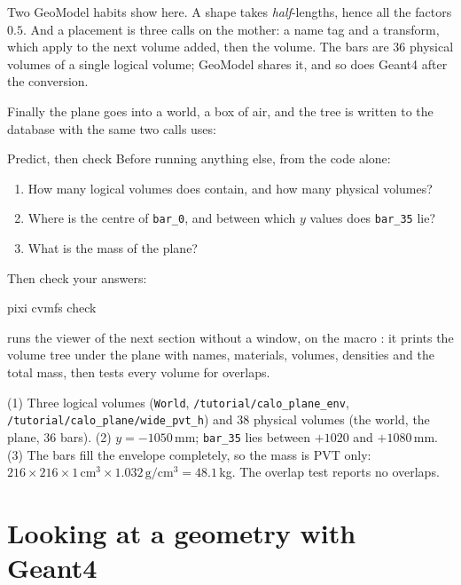 Two GeoModel habits show here. A shape takes \emph{half}-lengths, hence all
the factors $0.5$. And a placement is three calls on the mother: a name tag
and a transform, which apply to the next volume added, then the volume. The
bars are 36 physical volumes of a single logical volume; GeoModel shares it,
and so does Geant4 after the conversion.

Finally the plane goes into a world, a box of air, and the tree is written
to the database with the same two calls  uses:

\begin{exercise}{Predict, then check}
\label{ex:planepredict}
Before running anything else, from the code alone:
\begin{enumerate}
  \item How many logical volumes does  contain, and how
        many physical volumes?
  \item Where is the centre of \texttt{bar\_0}, and between which $y$ values
        does \texttt{bar\_35} lie?
  \item What is the mass of the plane?
\end{enumerate}
Then check your answers:
\begin{shell}
pixi cvmfs check
\end{shell}
 runs the viewer of the next section without a window, on the
macro : it prints the volume tree under the plane with
names, materials, volumes, densities and the total mass, then tests every
volume for overlaps.
\end{exercise}

\begin{solution}
(1) Three logical volumes (\texttt{World}, \texttt{/tutorial/calo\_plane\_env},
\texttt{/tutorial/calo\_plane/wide\_pvt\_h}) and 38 physical volumes (the
world, the plane, 36 bars). (2) $y=-1050$\,mm; \texttt{bar\_35} lies between
$+1020$ and $+1080$\,mm. (3) The bars fill the envelope completely, so the
mass is PVT only: $216\times216\times1\,\mathrm{cm}^3\times1.032\,
\mathrm{g/cm^3}=48.1$\,kg. The overlap test reports no overlaps.
\end{solution}

\section{Looking at a geometry with Geant4}
\label{sec:g4view}

